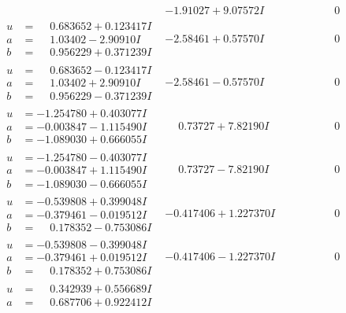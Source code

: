 \documentclass[1p]{elsarticle_modified}
\theoremstyle{definition}
\begin{document}
$$\begin{array}{c|c|c}
 & -1.91027 + 9.07572 I & \phantom{-0.000000 } 0 \\ \hline\begin{aligned}
u &= \phantom{-}0.683652 + 0.123417 I \\
a &= \phantom{-}1.03402 - 2.90910 I \\
b &= \phantom{-}0.956229 + 0.371239 I\end{aligned}
 & -2.58461 + 0.57570 I & \phantom{-0.000000 } 0 \\ \hline\begin{aligned}
u &= \phantom{-}0.683652 - 0.123417 I \\
a &= \phantom{-}1.03402 + 2.90910 I \\
b &= \phantom{-}0.956229 - 0.371239 I\end{aligned}
 & -2.58461 - 0.57570 I & \phantom{-0.000000 } 0 \\ \hline\begin{aligned}
u &= -1.254780 + 0.403077 I \\
a &= -0.003847 - 1.115490 I \\
b &= -1.089030 + 0.666055 I\end{aligned}
 & \phantom{-}0.73727 + 7.82190 I & \phantom{-0.000000 } 0 \\ \hline\begin{aligned}
u &= -1.254780 - 0.403077 I \\
a &= -0.003847 + 1.115490 I \\
b &= -1.089030 - 0.666055 I\end{aligned}
 & \phantom{-}0.73727 - 7.82190 I & \phantom{-0.000000 } 0 \\ \hline\begin{aligned}
u &= -0.539808 + 0.399048 I \\
a &= -0.379461 - 0.019512 I \\
b &= \phantom{-}0.178352 - 0.753086 I\end{aligned}
 & -0.417406 + 1.227370 I & \phantom{-0.000000 } 0 \\ \hline\begin{aligned}
u &= -0.539808 - 0.399048 I \\
a &= -0.379461 + 0.019512 I \\
b &= \phantom{-}0.178352 + 0.753086 I\end{aligned}
 & -0.417406 - 1.227370 I & \phantom{-0.000000 } 0 \\ \hline\begin{aligned}
u &= \phantom{-}0.342939 + 0.556689 I \\
a &= \phantom{-}0.687706 + 0.922412 I \\

\end{aligned}
\end{array}$$
\end{document}
